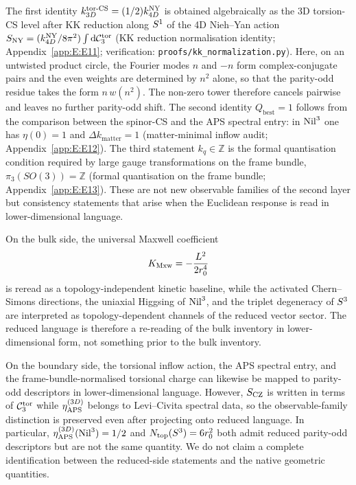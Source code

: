 The first identity $k_{3D}^{\mathrm{tor\text{-}CS}} = (1/2)k_{4D}^{\mathrm{NY}}$ is
obtained algebraically as the 3D torsion-CS level after KK reduction along
$S^1$ of the 4D Nieh--Yan action
$S_{\mathrm{NY}} = (k_{4D}^{\mathrm{NY}}/8\pi^2)\int \mathrm{d}\mathcal{C}_3^{\mathrm{tor}}$
(KK reduction normalisation identity; Appendix~\ref{app:E:E11};
verification: \texttt{proofs/kk\_normalization.py}).  Here, on an untwisted
product circle, the Fourier modes $n$ and $-n$ form complex-conjugate pairs
and the even weights are determined by $n^2$ alone, so that the parity-odd
residue takes the form $n\,w(n^2)$.  The non-zero tower therefore cancels
pairwise and leaves no further parity-odd shift.  The second identity
$Q_{\mathrm{best}} = 1$ follows from the comparison between the spinor-CS
and the APS spectral entry: in $\mathrm{Nil}^3$ one has $\eta(0) = 1$ and
$\Delta k_{\mathrm{matter}} = 1$ (matter-minimal inflow audit;
Appendix~\ref{app:E:E12}).  The third statement $k_q\in\mathbb{Z}$ is the
formal quantisation condition required by large gauge transformations
on the frame bundle, $\pi_3(SO(3)) = \mathbb{Z}$ (formal quantisation on the
frame bundle; Appendix~\ref{app:E:E13}).  These are not new observable
families of the second layer but consistency statements that arise when the
Euclidean response is read in lower-dimensional language.

On the bulk side, the universal Maxwell coefficient
\begin{equation}
  K_{\mathrm{Mxw}} = -\frac{L^2}{2r_0^4}
\end{equation}
is reread as a topology-independent kinetic baseline, while the activated
Chern--Simons directions, the uniaxial Higgsing of $\mathrm{Nil}^3$, and the
triplet degeneracy of $S^3$ are interpreted as topology-dependent
channels of the reduced vector sector.  The reduced language is therefore a
re-reading of the bulk inventory in lower-dimensional form, not something
prior to the bulk inventory.

On the boundary side, the torsional inflow action, the APS spectral entry,
and the frame-bundle-normalised torsional charge can likewise be mapped to
parity-odd descriptors in lower-dimensional language.  However, $S_{\mathrm{CZ}}$ is
written in terms of $\mathcal{C}_3^{\mathrm{tor}}$ while $\eta_{\mathrm{APS}}^{(3D)}$ belongs to Levi--Civita
spectral data, so the observable-family distinction is preserved even after
projecting onto reduced language.  In particular,
$\eta_{\mathrm{APS}}^{(3D)}(\mathrm{Nil}^3) = 1/2$ and $N_{\mathrm{top}}(S^3) = 6 r_0^2$ both admit
reduced parity-odd descriptors but are not the same quantity.  We do not
claim a complete identification between the reduced-side statements and the
native geometric quantities.


